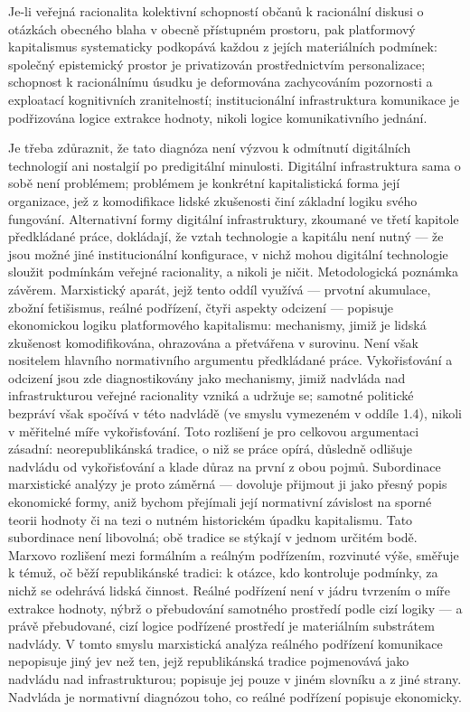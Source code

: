 Je-li veřejná racionalita kolektivní schopností občanů k racionální diskusi o otázkách obecného blaha v obecně přístupném prostoru, pak platformový kapitalismus systematicky podkopává každou z jejích materiálních podmínek:
společný epistemický prostor je privatizován prostřednictvím personalizace;
schopnost k racionálnímu úsudku je deformována zachycováním pozornosti a exploatací kognitivních zranitelností;
institucionální infrastruktura komunikace je podřizována logice extrakce hodnoty, nikoli logice komunikativního jednání.

Je třeba zdůraznit, že tato diagnóza není výzvou k odmítnutí digitálních technologií ani nostalgií po predigitální minulosti.
Digitální infrastruktura sama o sobě není problémem; problémem je konkrétní kapitalistická forma její organizace, jež z komodifikace lidské zkušenosti činí základní logiku svého fungování.
Alternativní formy digitální infrastruktury, zkoumané ve třetí kapitole předkládané práce, dokládají, že vztah technologie a kapitálu není nutný — že jsou možné jiné institucionální konfigurace, v nichž mohou digitální technologie sloužit podmínkám veřejné racionality, a nikoli je ničit.
Metodologická poznámka závěrem. Marxistický aparát, jejž tento oddíl využívá — prvotní akumulace, zbožní fetišismus, reálné podřízení, čtyři aspekty odcizení — popisuje ekonomickou logiku platformového kapitalismu: mechanismy, jimiž je lidská zkušenost komodifikována, ohrazována a přetvářena v surovinu.
Není však nositelem hlavního normativního argumentu předkládané práce.
Vykořisťování a odcizení jsou zde diagnostikovány jako mechanismy, jimiž nadvláda nad infrastrukturou veřejné racionality vzniká a udržuje se; samotné politické bezpráví však spočívá v této nadvládě (ve smyslu vymezeném v oddíle 1.4), nikoli v měřitelné míře vykořisťování.
Toto rozlišení je pro celkovou argumentaci zásadní: neorepublikánská tradice, o niž se práce opírá, důsledně odlišuje nadvládu od vykořisťování a klade důraz na první z obou pojmů. Subordinace marxistické analýzy je proto záměrná — dovoluje přijmout ji jako přesný popis ekonomické formy, aniž bychom přejímali její normativní závislost na sporné teorii hodnoty či na tezi o nutném historickém úpadku kapitalismu.
Tato subordinace není libovolná; obě tradice se stýkají v jednom určitém bodě.
Marxovo rozlišení mezi formálním a reálným podřízením, rozvinuté výše, směřuje k témuž, oč běží republikánské tradici: k otázce, kdo kontroluje podmínky, za nichž se odehrává lidská činnost.
Reálné podřízení není v jádru tvrzením o míře extrakce hodnoty, nýbrž o přebudování samotného prostředí podle cizí logiky — a právě přebudované, cizí logice podřízené prostředí je materiálním substrátem nadvlády.
V tomto smyslu marxistická analýza reálného podřízení komunikace nepopisuje jiný jev než ten, jejž republikánská tradice pojmenovává jako nadvládu nad infrastrukturou; popisuje jej pouze v jiném slovníku a z jiné strany.
Nadvláda je normativní diagnózou toho, co reálné podřízení popisuje ekonomicky.

